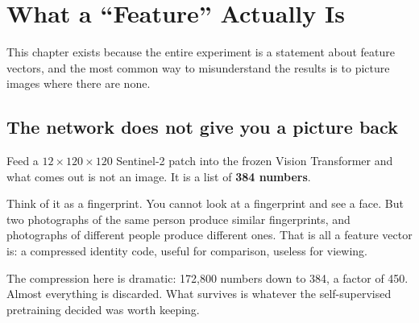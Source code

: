 \documentclass[11pt,a4paper]{report}
\newcommand{\zc}{\mathbf{z}_{\text{clean}}}
\begin{document}
\chapter{What a ``Feature'' Actually Is}
\label{ch:features}

This chapter exists because the entire experiment is a statement about feature
vectors, and the most common way to misunderstand the results is to picture
images where there are none.

\section{The network does not give you a picture back}

Feed a $12 \times 120 \times 120$ Sentinel-2 patch into the frozen Vision
Transformer and what comes out is not an image. It is a list of
\textbf{384 numbers}.

\begin{center}
\end{center}

\begin{intuition}
Think of it as a fingerprint. You cannot look at a fingerprint and see a face.
But two photographs of the same person produce similar fingerprints, and
photographs of different people produce different ones. That is all a feature
vector is: a compressed identity code, useful for comparison, useless for
viewing.

\medskip
The compression here is dramatic: 172{,}800 numbers down to 384, a factor of
450. Almost everything is discarded. What survives is whatever the
self-supervised pretraining decided was worth keeping.
\end{intuition}
\end{document}
